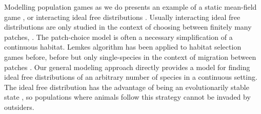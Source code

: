 



Modelling population games \citep{cressman2010ideal} as we do presents an example of a static mean-field game \citep{lasry2007mean}, or interacting ideal free distributions \citep{cressman2004ideal}. Usually interacting ideal free distributions are only studied in the context of choosing between finitely many patches, \citep{kvrivan2008ideal}. The patch-choice model is often a necessary simplification of a continuous habitat. Lemkes algorithm has been applied to habitat selection games before, before but only single-species in the context of migration between patches \citep{mariani2016migration}.
Our general modeling approach directly provides a model for finding ideal free distributions of an arbitrary number of species in a continuous setting. The ideal free distribution has the advantage of being an evolutionarily stable state \citep{cressman2010ideal, kvrivan2009evolutionary}, so populations where animals follow this strategy cannot be invaded by outsiders.


